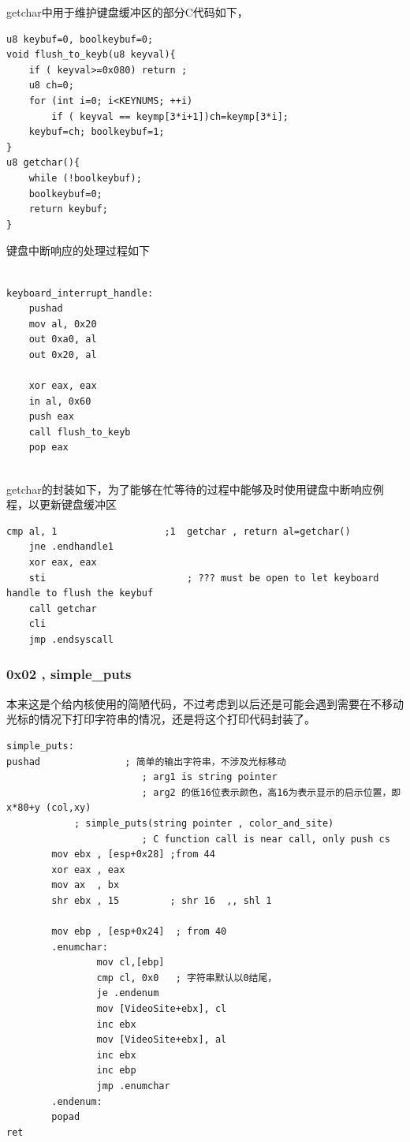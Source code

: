 \documentclass[a4paper,11pt,UTF8]{ctexart}
\begin{document}
		getchar中用于维护键盘缓冲区的部分C代码如下，
		\begin{lstlisting}[language={[ANSI]C},keywordstyle=\color{blue!70},commentstyle=\color{red!50!green!50!blue!50},frame=shadowbox, rulesepcolor=\color{red!20!green!20!blue!20}]
u8 keybuf=0, boolkeybuf=0;
void flush_to_keyb(u8 keyval){
	if ( keyval>=0x080) return ;
	u8 ch=0;
	for (int i=0; i<KEYNUMS; ++i)
		if ( keyval == keymp[3*i+1])ch=keymp[3*i];
	keybuf=ch; boolkeybuf=1;
}
u8 getchar(){
	while (!boolkeybuf);
	boolkeybuf=0;
	return keybuf;
}
		\end{lstlisting} 
		键盘中断响应的处理过程如下
		\begin{lstlisting}[language=={[x86masm]Assembler}keywordstyle=\color{blue!70},commentstyle=\color{red!50!green!50!blue!50},frame=shadowbox, rulesepcolor=\color{red!20!green!20!blue!20}]

keyboard_interrupt_handle:
	pushad
	mov al, 0x20
	out 0xa0, al
	out 0x20, al

	xor eax, eax
	in al, 0x60
	push eax
	call flush_to_keyb
	pop eax
	
			\end{lstlisting}
			getchar的封装如下，为了能够在忙等待的过程中能够及时使用键盘中断响应例程，以更新键盘缓冲区
		\begin{lstlisting}[language=={[x86masm]Assembler}keywordstyle=\color{blue!70},commentstyle=\color{red!50!green!50!blue!50},frame=shadowbox, rulesepcolor=\color{red!20!green!20!blue!20}]
	cmp al, 1					;1	getchar , return al=getchar()
	jne	.endhandle1
	xor eax, eax
	sti							; ??? must be open to let keyboard handle to flush the keybuf
	call getchar
	cli
	jmp .endsyscall
			\end{lstlisting}

		\subsubsection{0x02 , simple\_puts}
		本来这是个给内核使用的简陋代码，不过考虑到以后还是可能会遇到需要在不移动光标的情况下打印字符串的情况，还是将这个打印代码封装了。
			\begin{lstlisting}[language=={[x86masm]Assembler}keywordstyle=\color{blue!70},commentstyle=\color{red!50!green!50!blue!50},frame=shadowbox, rulesepcolor=\color{red!20!green!20!blue!20}]
simple_puts:
pushad               ; 简单的输出字符串，不涉及光标移动
						; arg1 is string pointer
						; arg2 的低16位表示颜色，高16为表示显示的启示位置，即x*80+y (col,xy)
			; simple_puts(string pointer , color_and_site)
						; C function call is near call, only push cs
		mov ebx , [esp+0x28] ;from 44
		xor eax , eax
		mov ax  , bx
		shr ebx , 15         ; shr 16  ,, shl 1

		mov ebp , [esp+0x24]  ; from 40
		.enumchar:
				mov cl,[ebp]
				cmp cl, 0x0   ; 字符串默认以0结尾，
				je .endenum
				mov [VideoSite+ebx], cl
				inc ebx
				mov [VideoSite+ebx], al
				inc ebx
				inc ebp
				jmp .enumchar
		.endenum:
		popad
ret
		 
			\end{lstlisting}
\end{document}
